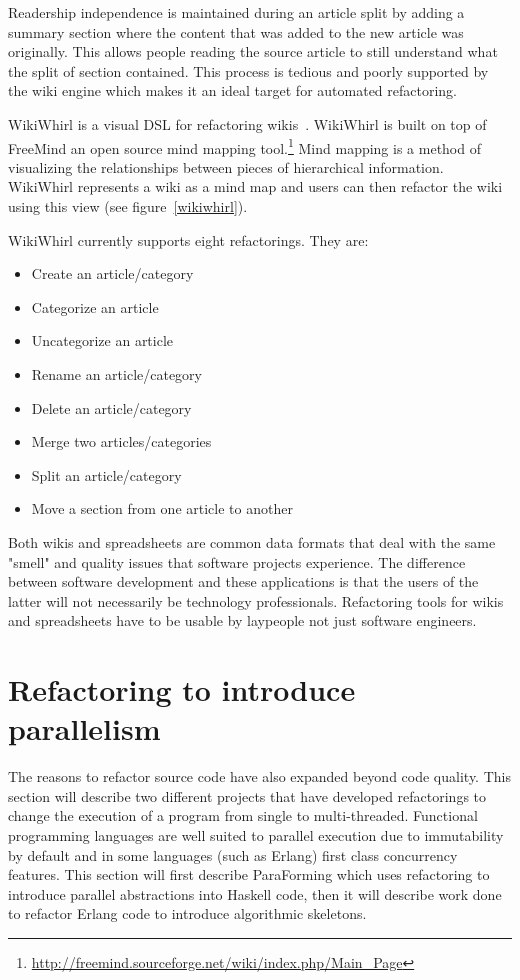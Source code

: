 Readership independence is maintained during an article split by adding a summary section where the content that was added to the new article was originally. This allows people reading the source article to still understand what the split of section contained. This process is tedious and poorly supported by the wiki engine which makes it an ideal target for automated refactoring.

WikiWhirl is a visual DSL for refactoring wikis~\citep{wikiMaps}. WikiWhirl is built on top of FreeMind an open source mind mapping tool.\footnote{\url{http://freemind.sourceforge.net/wiki/index.php/Main_Page}} Mind mapping is a method of visualizing the relationships between pieces of  hierarchical information. WikiWhirl represents a wiki as a mind map and users can then refactor the wiki using this view (see figure~\ref{wikiwhirl}). 


WikiWhirl currently supports eight refactorings. They are:

\begin{itemize}
	\item Create an article/category
	\item Categorize an article
	\item Uncategorize an article
	\item Rename an article/category
	\item Delete an article/category
	\item Merge two articles/categories
	\item Split an article/category
	\item Move a section from one article to another
\end{itemize}

Both wikis and spreadsheets are common data formats that deal with the same "smell" and quality issues that software projects experience. The difference between software development and these applications is that the users of the latter will not necessarily be technology professionals. Refactoring tools for wikis and spreadsheets have to be usable by laypeople not just software engineers. 

\section{Refactoring to introduce parallelism}\label{refacParallel}

The reasons to refactor source code have also expanded beyond code quality. This section will describe two different projects that have developed refactorings to change the execution of a program from single to multi-threaded. Functional programming languages are well suited to parallel execution due to immutability by default and in some languages (such as Erlang) first class concurrency features. This section will first describe ParaForming which uses refactoring to introduce parallel abstractions into Haskell code, then it will describe work done to refactor Erlang code to introduce algorithmic skeletons.

